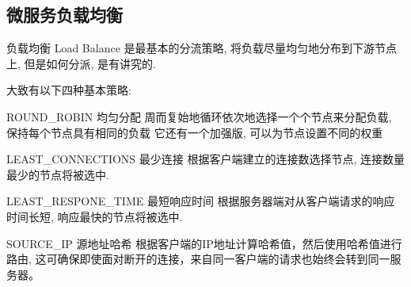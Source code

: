 \documentclass[../../../interview-questions.tex]{subfiles}
\begin{document}
\subsection{微服务负载均衡}

负载均衡 Load Balance 是最基本的分流策略, 将负载尽量均匀地分布到下游节点上, 但是如何分派, 是有讲究的.

大致有以下四种基本策略:

ROUND\_ROBIN 均匀分配
周而复始地循环依次地选择一个个节点来分配负载, 保持每个节点具有相同的负载
它还有一个加强版, 可以为节点设置不同的权重

LEAST\_CONNECTIONS 最少连接
根据客户端建立的连接数选择节点, 连接数量最少的节点将被选中.

LEAST\_RESPONE\_TIME 最短响应时间
根据服务器端对从客户端请求的响应时间长短, 响应最快的节点将被选中.

SOURCE\_IP 源地址哈希
根据客户端的IP地址计算哈希值，然后使用哈希值进行路由, 这可确保即使面对断开的连接，来自同一客户端的请求也始终会转到同一服务器。
\end{document}
